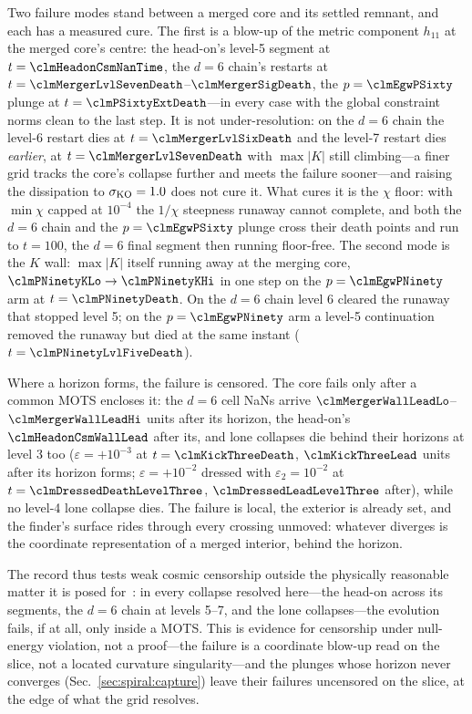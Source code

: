 \documentclass[twocolumn,floatfix,aps,prd,superscriptaddress,nofootinbib]{revtex4-2}
\begin{document}
Two failure modes stand between a merged core and its settled remnant, and each has a measured cure. The first is a blow-up of the metric component $h_{11}$ at the merged core's centre: the head-on's level-5 segment at $t=\clmHeadonCsmNanTime$, the $d=6$ chain's restarts at $t=\clmMergerLvlSevenDeath$--$\clmMergerSigDeath$, the $p=\clmEgwPSixty$ plunge at $t=\clmPSixtyExtDeath$---in every case with the global constraint norms clean to the last step. It is not under-resolution: on the $d=6$ chain the level-6 restart dies at $t=\clmMergerLvlSixDeath$ and the level-7 restart dies \emph{earlier}, at $t=\clmMergerLvlSevenDeath$ with $\max|K|$ still climbing---a finer grid tracks the core's collapse further and meets the failure sooner---and raising the dissipation to $\sigma_{\rm KO}=1.0$ does not cure it. What cures it is the $\chi$ floor: with $\min\chi$ capped at $10^{-4}$ the $1/\chi$ steepness runaway cannot complete, and both the $d=6$ chain and the $p=\clmEgwPSixty$ plunge cross their death points and run to $t=100$, the $d=6$ final segment then running floor-free. The second mode is the $K$ wall: $\max|K|$ itself running away at the merging core, $\clmPNinetyKLo\to\clmPNinetyKHi$ in one step on the $p=\clmEgwPNinety$ arm at $t=\clmPNinetyDeath$. On the $d=6$ chain level 6 cleared the runaway that stopped level 5; on the $p=\clmEgwPNinety$ arm a level-5 continuation removed the runaway but died at the same instant ($t=\clmPNinetyLvlFiveDeath$).

Where a horizon forms, the failure is censored. The core fails only after a common MOTS encloses it: the $d=6$ cell NaNs arrive $\clmMergerWallLeadLo$--$\clmMergerWallLeadHi$ units after its horizon, the head-on's $\clmHeadonCsmWallLead$ after its, and lone collapses die behind their horizons at level 3 too ($\varepsilon=+10^{-3}$ at $t=\clmKickThreeDeath$, $\clmKickThreeLead$ units after its horizon forms; $\varepsilon=+10^{-2}$ dressed with $\varepsilon_2=10^{-2}$ at $t=\clmDressedDeathLevelThree$, $\clmDressedLeadLevelThree$ after), while no level-4 lone collapse dies. The failure is local, the exterior is already set, and the finder's surface rides through every crossing unmoved: whatever diverges is the coordinate representation of a merged interior, behind the horizon.

The record thus tests weak cosmic censorship outside the physically reasonable matter it is posed for~\cite{penrose1969,wald1997}: in every collapse resolved here---the head-on across its segments, the $d=6$ chain at levels 5--7, and the lone collapses---the evolution fails, if at all, only inside a MOTS. This is evidence for censorship under null-energy violation, not a proof---the failure is a coordinate blow-up read on the slice, not a located curvature singularity---and the plunges whose horizon never converges (Sec.~\ref{sec:spiral:capture}) leave their failures uncensored on the slice, at the edge of what the grid resolves.
\end{document}
